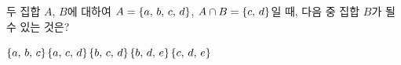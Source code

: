 두 집합 $A$, $B$에 대하여 $A=\{a,\mkern3mu b,\mkern3mu c,\mkern3mu d\}$, $A\cap B=\{c,\mkern3mu d\}$일 때, 다음 중 집합 $B$가 될 수 있는 것은?
\begin{choicesii}{$\{a,\mkern3mu b,\mkern3mu c\}$}{$\{a,\mkern3mu c,\mkern3mu d\}$}{$\{b,\mkern3mu c,\mkern3mu d\}$}{$\{b,\mkern3mu d,\mkern3mu e\}$}{$\{c,\mkern3mu d,\mkern3mu e\}$}\end{choicesii}

